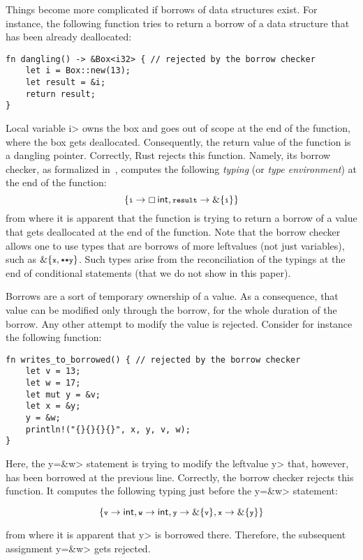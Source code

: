 Things become more complicated if borrows of data structures exist.
For instance, the following function tries to return a borrow of
a data structure that has been already deallocated:

\begin{verbatim}
fn dangling() -> &Box<i32> { // rejected by the borrow checker
    let i = Box::new(13);
    let result = &i;
    return result;
}
\end{verbatim}

\noindent
Local variable \<i> owns the box and goes out of scope at the end of the
function, where the box gets deallocated. Consequently, the return value of
the function is a dangling pointer. Correctly, Rust rejects this function.
Namely, its borrow checker, as formalized in~\cite{Pearce21}, computes the
following \emph{typing} (or \emph{type environment}) at the end of the function:
\[
\{\<i>\to\boxtype{\mathsf{int},\<result>\to\borrow\{\<i>\}}\}
\]
from where it is apparent that the function is trying to return a borrow
of a value that gets deallocated at the end of the function. Note that the borrow
checker allows one to
use types that are borrows of more leftvalues (not just variables),
such as $\borrow\{\<x>,\<**y>\}$.
Such types arise from the reconciliation of the typings at the end of
conditional statements (that we do not show in this paper).

Borrows are a sort of temporary ownership of a value. As a consequence,
that value can be modified only through the borrow, for the whole
duration of the borrow. Any other attempt to modify the value is rejected.
Consider for instance the following function:

\begin{verbatim}
fn writes_to_borrowed() { // rejected by the borrow checker
    let v = 13;
    let w = 17;
    let mut y = &v;
    let x = &y;
    y = &w;
    println!("{}{}{}{}", x, y, v, w);
}
\end{verbatim}

\noindent
Here, the \<y=\&w> statement is trying to modify the leftvalue \<y>
that, however, has been borrowed at the previous line. Correctly, the borrow
checker rejects this function. It computes the following typing
just before the \<y=\&w> statement:

\[
\{\<v>\to\mathsf{int},\<w>\to\mathsf{int},\<y>\to\borrow\{\<v>\},\<x>\to\borrow\{\<y>\}\}
\]

\noindent
from where it is apparent that \<y> is borrowed there. Therefore,
the subsequent assignment \<y=\&w> gets rejected.

